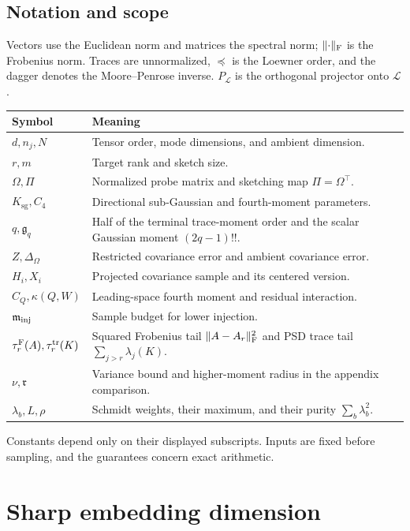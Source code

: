 \documentclass[11pt,a4paper]{article}
\theoremstyle{definition}\newtheorem{definition}[theorem]{Definition}
\theoremstyle{remark}\newtheorem{remark}[theorem]{Remark}
\numberwithin{equation}{section}
\newcommand{\Ksg}{{K_{\mathrm{sg}}}}\newcommand{\Cfour}{{C_4}}
\newcommand{\gmom}{\mathfrak g}
\newcommand{\Rmom}{\mathfrak r}
\newcommand{\norm}[1]{\lVert#1\rVert}\newcommand{\ip}[2]{\langle#1,#2\rangle}
\begin{document}
\subsection{Notation and scope}
Vectors use the Euclidean norm and matrices the spectral norm;
$\norm{\cdot}_{\F}$ is the Frobenius norm. Traces are unnormalized,
$\preceq$ is the Loewner order, and the dagger denotes the Moore--Penrose
inverse. $P_{\mathcal L}$ is the orthogonal projector onto $\mathcal L$.
\begin{center}\begin{minipage}{\linewidth}\small
\begin{tabularx}{\linewidth}{@{}p{.28\linewidth}Y@{}}
\toprule Symbol & Meaning\\\midrule
$d,n_j,N$ & Tensor order, mode dimensions, and ambient dimension.\\
$r,m$ & Target rank and sketch size.\\
$\Omega,\Pi$ & Normalized probe matrix and sketching map $\Pi=\Omega^\top$.\\
$\Ksg,\Cfour$ & Directional sub-Gaussian and fourth-moment parameters.\\
$q,\gmom_q$ & Half of the terminal trace-moment order and the scalar Gaussian moment $(2q-1)!!$.\\
$Z,\Delta_\Omega$ & Restricted covariance error and ambient covariance error.\\
$H_i,X_i$ & Projected covariance sample and its centered version.\\
$C_Q,\kappa(Q,W)$ & Leading-space fourth moment and residual interaction.\\
$\mathfrak m_{\rm inj}$ & Sample budget for lower injection.\\
$\tau_r^{\rm F}(A),\tau_r^{\rm tr}(K)$ & Squared Frobenius tail $\|A-A_r\|_\mathrm F^2$ and PSD trace tail $\sum_{j>r}\lambda_j(K)$.\\
$\nu,\Rmom$ & Variance bound and higher-moment radius in the appendix comparison.\\
$\lambda_b,L,\rho$ & Schmidt weights, their maximum, and their purity $\sum_b\lambda_b^2$.\\
\bottomrule
\end{tabularx}
\end{minipage}\end{center}
Constants depend only on their displayed subscripts. Inputs are fixed
before sampling, and the guarantees concern exact arithmetic.

\section{Sharp embedding dimension}
\label{core:sec:embedding}
\end{document}
